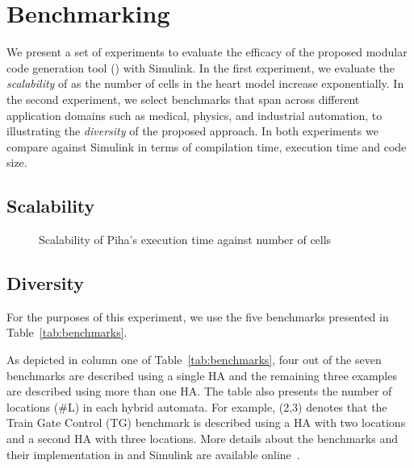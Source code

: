 \section{Benchmarking}
\label{sec:benchmarking}


We present a set of experiments to 
evaluate  the efficacy of the proposed 
 modular code generation tool (\ourTool) 
with Simulink. 
In the first experiment, we evaluate the \emph{scalability} 
of \ourTool as the number of cells in the heart model
increase exponentially. 
In the second experiment, we select benchmarks 
that span across different application
domains such as medical, physics, and 
industrial automation, to illustrating the \emph{diversity} of the proposed 
approach. 
In both experiments we compare against Simulink in terms of compilation time,
execution time and code size.


\subsection{Scalability}
\begin{figure}[htbp]
	\centering
	
	\caption{Scalability of Piha's execution time against number of cells}
	\label{fig:scalability}
\end{figure}

\subsection{Diversity}
For the purposes of this experiment, we use the five benchmarks presented in
Table~\ref{tab:benchmarks}. 


As depicted in column one of Table~\ref{tab:benchmarks}, four out of the 
seven benchmarks are described using a single \ac{HA} and 
the remaining three examples are described using more than one \ac{HA}.
The table also presents the 
number of locations (\#L) in each hybrid automata.
For example, (2,3) denotes that the Train Gate Control
(TG) benchmark is described using a HA with two locations 
and a second HA with three locations. More details
about the benchmarks and their 
implementation in 
and Simulink
are available online~\cite{githubBenchmarks}.

